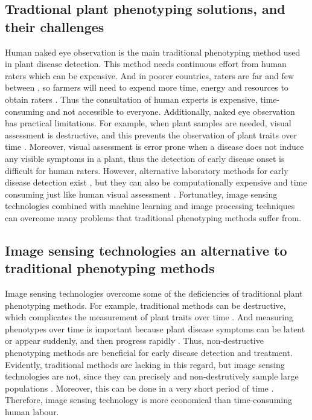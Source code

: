 \subsection{Tradtional plant phenotyping solutions, and their challenges}
Human naked eye observation is the main traditional phenotyping method used in plant disease detection. This method needs continuous effort from human raters which can be expensive. And in poorer countries, raters are far and few between \cite{rameshPlantDiseaseDetection2018, basavaiahTomatoLeafDisease2020, sambanaEfficientPlantDisease2025}, so farmers will need to expend more time, energy and resources to obtain raters \cite{alhiaryFastAccurateDetection2011, DetectionClassificationLeaf2025, gillComprehensiveReviewHigh2022}. Thus the consultation of human experts is expensive, time-consuming and not accessible to everyone. Additionally, naked eye observation has practical limitations. For example, when plant samples are needed, visual assessment is destructive, and this prevents the observation of plant traits over time \cite{gehanPlantCVV2Image2017, gillComprehensiveReviewHigh2022, hangClassificationPlantLeaf2019}. Moreover, visual assessment is error prone when a disease does not induce any visible symptoms in a plant, thus the detection of early disease onset is difficult for human raters. However, alternative laboratory methods for early disease detection exist \cite{arnalbarbedoDigitalImageProcessing2013}, but they can also be computationally expensive and time consuming just like human visual assessment \cite{basavaiahTomatoLeafDisease2020, rameshPlantDiseaseDetection2018, bockPlantDiseaseSeverity2010, PlantDiseaseDetection}. Fortunatley, image sensing technologies combined with machine learning and image processing techniques can overcome many problems that traditional phenotyping methods suffer from.

\subsection{Image sensing technologies an alternative to traditional phenotyping methods}
Image sensing technologies overcome some of the deficiencies of traditional plant phenotyping methods. For example, traditional methods can be destructive, which complicates the measurement of plant traits over time \cite{gehanPlantCVV2Image2017, gillComprehensiveReviewHigh2022, hangClassificationPlantLeaf2019}. And measuring phenotypes over time is important because plant disease symptoms can be latent or appear suddenly, and then progress rapidly \cite{mutkaImagebasedPhenotypingPlant2015a, chenHyperspectralImagingdrivenDeep2025}. Thus, non-destructive phenotyping methods are beneficial for early disease detection and treatment. Evidently, traditional methods are lacking in this regard, but image sensing technologies are not, since they can precisely and non-destrutively sample large populations \cite{benchangzhang1UtilizingHighThroughputPhenotyping2024, heHighThroughputRoboticPhenotyping2025}. Moreover, this can be done in a very short period of time \cite{daschoudhuryLeveragingImageAnalysis2019}. Therefore, image sensing technology is more economical than time-consuming human labour. 

